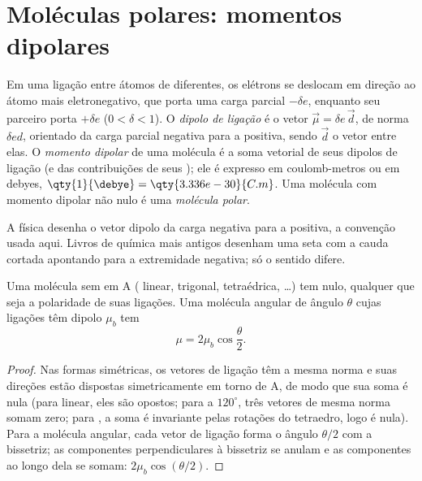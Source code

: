 \section{Moléculas polares: momentos dipolares}

\begin{definition}\label{def:b1:lewis-resonance-vsepr:dipole}
Em uma ligação entre átomos de  diferentes, os
elétrons se deslocam em direção ao átomo mais eletronegativo, que porta
uma carga parcial $-\delta e$, enquanto seu parceiro porta $+\delta e$
($0 < \delta < 1$). O
\emph{dipolo de ligação} é o vetor $\vec\mu = \delta e\,
\vec d$, de norma $\delta e d$, orientado da carga parcial negativa para
a positiva, sendo $\vec d$ o vetor entre elas. O
\emph{momento dipolar} de uma molécula é a soma
vetorial de seus dipolos de ligação (e das contribuições de seus ); ele é expresso em coulomb-metros ou em debyes, $\qty{1}{\debye} =
\qty{3.336e-30}{C.m}$. Uma molécula com momento dipolar não nulo é uma
\emph{molécula polar}.
\end{definition}

\begin{remark}\label{rem:b1:lewis-resonance-vsepr:convention}
A física desenha o vetor dipolo da carga negativa para a positiva, a
convenção usada aqui. Livros de química mais antigos desenham uma seta
com a cauda cortada apontando para a extremidade negativa; só o sentido
difere.
\end{remark}

\begin{proposition}\label{prop:b1:lewis-resonance-vsepr:dipole-sum}
Uma molécula  sem  em A ( linear,
 trigonal,  tetraédrica, \dots) tem  nulo,
qualquer que seja a polaridade de suas ligações. Uma molécula 
angular de ângulo $\theta$ cujas ligações têm dipolo $\mu_b$ tem 
\[
  \mu = 2\mu_b \cos\frac{\theta}{2} .
\]
\end{proposition}

\begin{proof}
Nas formas simétricas, os vetores de ligação têm a mesma norma e suas
direções estão dispostas simetricamente em torno de A, de modo que sua
soma é nula (para  linear, eles são opostos; para  a
$120^\circ$, três vetores de mesma norma somam zero; para , a
soma é invariante pelas rotações do tetraedro, logo é nula). Para a
molécula angular, cada vetor de ligação forma o ângulo $\theta/2$ com a
bissetriz; as componentes perpendiculares à bissetriz se anulam e as
componentes ao longo dela se somam: $2\mu_b\cos(\theta/2)$.
\end{proof}

